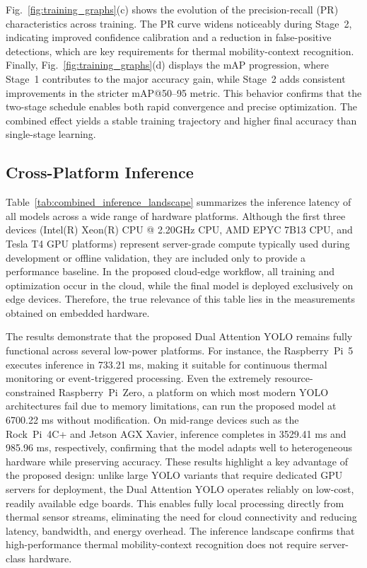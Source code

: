 \documentclass[journal,twoside,web]{ieeecolor}
\begin{document}
Fig.~\ref{fig:training_graphs}(c) shows the evolution of the precision-recall (PR) characteristics across training. The PR curve widens noticeably during Stage~2, indicating improved confidence calibration and a reduction in false-positive detections, which are key requirements for thermal mobility-context recognition. Finally, Fig.~\ref{fig:training_graphs}(d) displays the mAP progression, where Stage~1 contributes to the major accuracy gain, while Stage~2 adds consistent improvements in the stricter mAP@50--95 metric. This behavior confirms that the two-stage schedule enables both rapid convergence and precise optimization. The combined effect yields a stable training trajectory and higher final accuracy than single-stage learning.

\subsection{Cross-Platform Inference}

Table~\ref{tab:combined_inference_landscape} summarizes the inference latency of all models across a wide range of hardware platforms. Although the first three devices (Intel(R) Xeon(R) CPU @ 2.20GHz CPU, AMD EPYC 7B13 CPU, and Tesla T4 GPU platforms) represent server-grade compute typically used during development or offline validation, they are included only to provide a performance baseline. In the proposed cloud-edge workflow, all training and optimization occur in the cloud, while the final model is deployed exclusively on edge devices. Therefore, the true relevance of this table lies in the measurements obtained on embedded hardware.

The results demonstrate that the proposed Dual Attention YOLO remains fully functional across several low-power platforms. For instance, the Raspberry~Pi~5 executes inference in 733.21 ms, making it suitable for continuous thermal monitoring or event-triggered processing. Even the extremely resource-constrained Raspberry~Pi~Zero, a platform on which most modern YOLO architectures fail due to memory limitations, can run the proposed model at 6700.22 ms without modification. On mid-range devices such as the Rock~Pi~4C+ and Jetson AGX Xavier, inference completes in 3529.41 ms and 985.96 ms, respectively, confirming that the model adapts well to heterogeneous hardware while preserving accuracy. These results highlight a key advantage of the proposed design: unlike large YOLO variants that require dedicated GPU servers for deployment, the Dual Attention YOLO operates reliably on low-cost, readily available edge boards. This enables fully local processing directly from thermal sensor streams, eliminating the need for cloud connectivity and reducing latency, bandwidth, and energy overhead. The inference landscape confirms that high-performance thermal mobility-context recognition does not require server-class hardware. 
\end{document}
